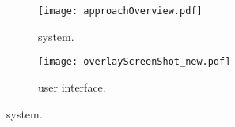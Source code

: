 \begin{figure}[t]
    \begin{center}
        \begin{subfigure}{0.4\textwidth}
        \centering
            \texttt{[image: approachOverview.pdf]}
             \caption{\protection system.}
            \label{fig:architecture}    
        \end{subfigure}
    \end{center}
    
    
    \begin{center}
        \begin{subfigure}{0.5\textwidth}
        \centering
       \texttt{[image: overlayScreenShot\_new.pdf]}
    \caption{\protection user interface.} %
        \label{fig:screenshot}
    \end{subfigure}
    \end{center}
    
    \vspace{-10pt}
    \caption{\protection system.} 
    \label{fig:protection}
\end{figure}


% 
% 

